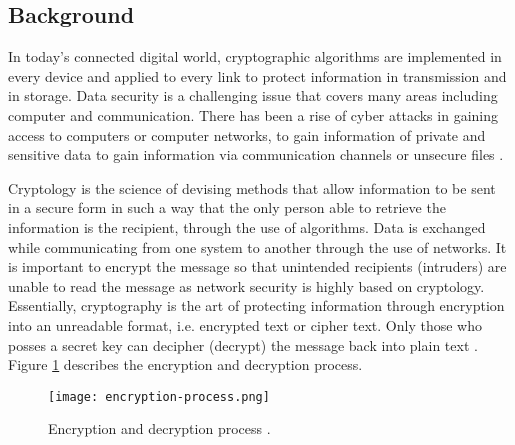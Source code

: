 \subsection{Background}

In today's connected digital world, cryptographic algorithms are implemented in every device and applied to every link to protect information in transmission and in storage.
Data security is a challenging issue that covers many areas including computer and communication.
There has been a rise of cyber attacks in gaining access to computers or computer networks, to gain information of private and sensitive data to gain information via communication channels or unsecure files \cite{csis2025significant}. 

Cryptology is the science of devising methods that allow information to be sent in a secure form in such a way that the only person able to retrieve the information is the recipient, through the use of algorithms. 
Data is exchanged while communicating from one system to another through the use of networks. 
It is important to encrypt the message so that unintended recipients (intruders) are unable to read the message as network security is highly based on cryptology.
Essentially, cryptography is the art of protecting information through encryption into an unreadable format, i.e. encrypted text or cipher text. 
Only those who posses a secret key can decipher (decrypt) the message back into plain text \cite{Bhanot_2015}. 
Figure \ref{fig:encryption-process.png} describes the encryption and decryption process. 

\begin{figure}[h]
    \centering
    \texttt{[image: encryption-process.png]}
    \caption{Encryption and decryption process \cite{Bhanot_2015}.}
    \label{fig:encryption-process.png}
\end{figure}

